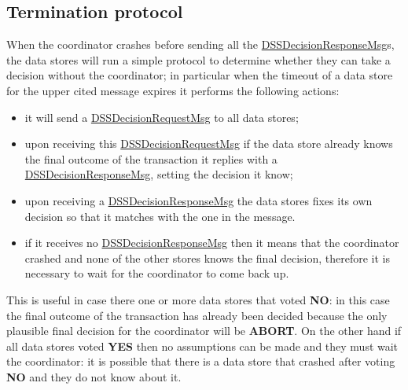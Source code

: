\subsection{Termination protocol}
When the coordinator crashes before sending all the \url{DSSDecisionResponseMsg}s, the data stores will run a simple protocol to determine whether they can take a decision without the coordinator; in particular when the timeout of a data store for the upper cited message expires it performs the following actions:
\begin{itemize}
    \item it will send a \url{DSSDecisionRequestMsg} to all data stores;
    \item upon receiving this \url{DSSDecisionRequestMsg} if the data store already knows the final outcome of the transaction it replies with a \url{DSSDecisionResponseMsg}, setting the decision it know;
    \item upon receiving a \url{DSSDecisionResponseMsg} the data stores fixes its own decision so that it matches with the one in the message.
    \item if it receives no \url{DSSDecisionResponseMsg} then it means that the coordinator crashed and none of the other stores knows the final decision, therefore it is necessary to wait for the coordinator to come back up.
\end{itemize}
This is useful in case there one or more data stores that voted \textbf{NO}: in this case the final outcome of the transaction has already been decided because the only plausible final decision for the coordinator will be \textbf{ABORT}.
\newline
On the other hand if all data stores voted \textbf{YES} then no assumptions can be made and they must wait the coordinator: it is possible that there is a data store that crashed after voting \textbf{NO} and they do not know about it.


